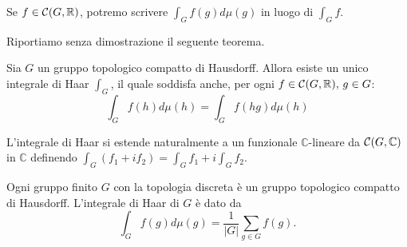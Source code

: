 Se $f\in\mathcal{C}(G,\mathbb{R})$, potremo scrivere $\int_G f(g)d\mu(g)$ in luogo di $\int_G f$.

Riportiamo senza dimostrazione il seguente teorema.
\begin{proposition}[Haar]
Sia $G$ un gruppo topologico compatto di Hausdorff. Allora esiste un unico integrale di Haar $\int_G$, il quale soddisfa anche, per ogni $f\in\mathcal{C}(G,\mathbb{R}),\,\allowbreak g\in G$:
$$
\int_Gf(h)d\mu(h)=\int_Gf(hg)d\mu(h)
$$
\end{proposition}
L'integrale di Haar si estende naturalmente a un funzionale $\mathbb{C}$-lineare da $\mathcal{C}(G,\mathbb{C})$ in $\mathbb{C}$ definendo $\int_G(f_1+if_2)=\int_Gf_1+i\int_Gf_2$.

\begin{example}
Ogni gruppo finito $G$ con la topologia discreta è un gruppo topologico compatto di Hausdorff. L'integrale di Haar di $G$ è dato da
$$
\int_Gf(g)d\mu(g)=\frac{1}{|G|}\sum_{g\in G}f(g).
$$
\end{example}


